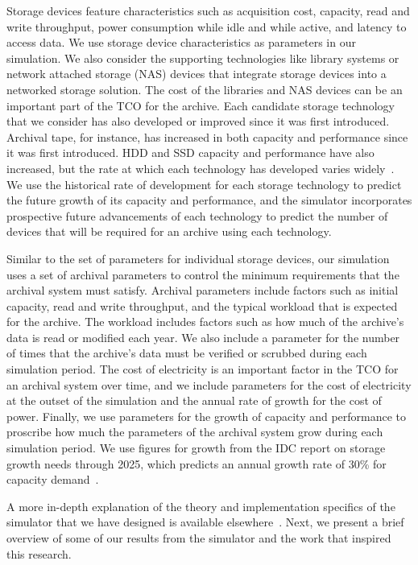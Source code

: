 Storage devices feature characteristics such as acquisition cost, capacity, read and write throughput, power consumption while idle and while active, and latency to access data.  We use storage device characteristics as parameters in our simulation.  We also consider the supporting technologies like library systems or network attached storage (NAS) devices that integrate storage devices into a networked storage solution.  The cost of the libraries and NAS devices can be an important part of the TCO for the archive.  Each candidate storage technology that we consider has also developed or improved since it was first introduced.  Archival tape, for instance, has increased in both capacity and performance since it was first introduced.  HDD and SSD capacity and performance have also increased, but the rate at which each technology has developed varies widely~\cite{byronmaster}.  We use the historical rate of development for each storage technology to predict the future growth of its capacity and performance, and the simulator incorporates prospective future advancements of each technology to predict the number of devices that will be required for an archive using each technology.

Similar to the set of parameters for individual storage devices, our simulation uses a set of archival parameters to control the minimum requirements that the archival system must satisfy.  Archival parameters include factors such as initial capacity, read and write throughput, and the typical workload that is expected for the archive.  The workload includes factors such as how much of the archive's data is read or modified each year.  We also include a parameter for the number of times that the archive's data must be verified or scrubbed during each simulation period.  The cost of electricity is an important factor in the TCO for an archival system over time, and we include parameters for the cost of electricity at the outset of the simulation and the annual rate of growth for the cost of power.  Finally, we use parameters for the growth of capacity and performance to proscribe how much the parameters of the archival system grow during each simulation period.  We use figures for growth from the IDC report on storage growth needs through 2025, which predicts an annual growth rate of 30\% for capacity demand~\cite{idc1}.

A more in-depth explanation of the theory and implementation specifics of the simulator that we have designed is available elsewhere~\cite{byronmaster}.  Next, we present a brief overview of some of our results from the simulator and the work that inspired this research.

